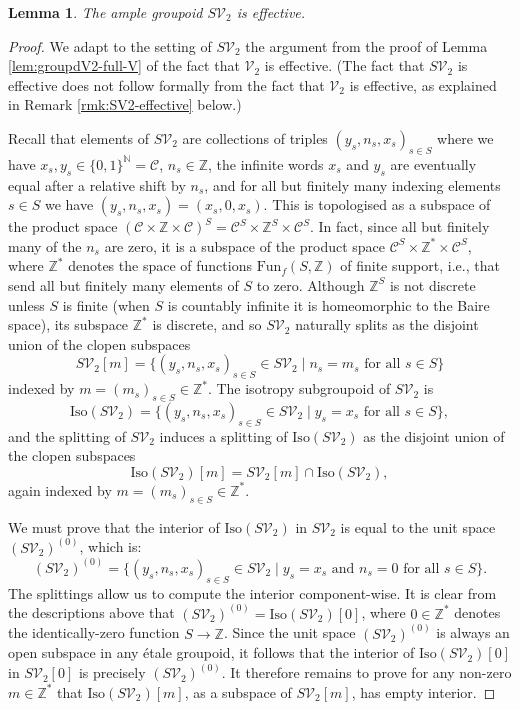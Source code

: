 \documentclass[10pt,a4paper]{amsart}
\numberwithin{equation}{section}
\numberwithin{figure}{section}
\newtheorem{lem}[thm]{Lemma}
\theoremstyle{definition}
\newcommand{\cC}{\mathcal{C}}
\newcommand{\cV}{\mathcal{V}}
\newcommand{\bN}{\mathbb{N}}
\newcommand{\bZ}{\mathbb{Z}}
\begin{document}
\begin{lem}
\label{lem:SV2-is-effective}
The ample groupoid $S\cV_2$ is effective.
\end{lem}
\begin{proof}
We adapt to the setting of $S\cV_2$ the argument from the proof of Lemma \ref{lem:groupdV2-full-V} of the fact that $\cV_2$ is effective. (The fact that $S\cV_2$ is effective does not follow formally from the fact that $\cV_2$ is effective, as explained in Remark \ref{rmk:SV2-effective} below.)

Recall that elements of $S\cV_2$ are collections of triples $(y_s,n_s,x_s)_{s \in S}$ where we have $x_s,y_s \in \{0,1\}^\bN = \cC$, $n_s \in \bZ$, the infinite words $x_s$ and $y_s$ are eventually equal after a relative shift by $n_s$, and for all but finitely many indexing elements $s \in S$ we have $(y_s,n_s,x_s) = (x_s,0,x_s)$. This is topologised as a subspace of the product space $(\cC \times \bZ \times \cC)^S = \cC^S \times \bZ^S \times \cC^S$. In fact, since all but finitely many of the $n_s$ are zero, it is a subspace of the product space $\cC^S \times \bZ^* \times \cC^S$, where $\bZ^*$ denotes the space of functions $\mathrm{Fun}_f(S,\bZ)$ of finite support, i.e., that send all but finitely many elements of $S$ to zero. Although $\bZ^S$ is not discrete unless $S$ is finite (when $S$ is countably infinite it is homeomorphic to the Baire space), its subspace $\bZ^*$ is discrete, and so $S\cV_2$ naturally splits as the disjoint union of the clopen subspaces
\[
S\cV_2[m] = \{ (y_s,n_s,x_s)_{s \in S} \in S\cV_2 \mid n_s = m_s \text{ for all } s \in S \}
\]
indexed by $m = (m_s)_{s \in S} \in \bZ^*$. The isotropy subgroupoid of $S\cV_2$ is
\[
\mathrm{Iso}(S\cV_2) = \{ (y_s,n_s,x_s)_{s \in S} \in S\cV_2 \mid y_s = x_s \text{ for all } s \in S \} ,
\]
and the splitting of $S\cV_2$ induces a splitting of $\mathrm{Iso}(S\cV_2)$ as the disjoint union of the clopen subspaces
\[
\mathrm{Iso}(S\cV_2)[m] = S\cV_2[m] \cap \mathrm{Iso}(S\cV_2),
\]
again indexed by $m = (m_s)_{s \in S} \in \bZ^*$.

We must prove that the interior of $\mathrm{Iso}(S\cV_2)$ in $S\cV_2$ is equal to the unit space $(S\cV_2)^{(0)}$, which is:
\[
(S\cV_2)^{(0)} = \{ (y_s,n_s,x_s)_{s \in S} \in S\cV_2 \mid y_s = x_s \text{ and } n_s = 0 \text{ for all } s \in S \} .
\]
The splittings allow us to compute the interior component-wise. It is clear from the descriptions above that $(S\cV_2)^{(0)} = \mathrm{Iso}(S\cV_2)[0]$, where $0 \in \bZ^*$ denotes the identically-zero function $S \to \bZ$. Since the unit space $(S\cV_2)^{(0)}$ is always an open subspace in any étale groupoid, it follows that the interior of $\mathrm{Iso}(S\cV_2)[0]$ in $S\cV_2[0]$ is precisely $(S\cV_2)^{(0)}$. It therefore remains to prove for any non-zero $m \in \bZ^*$ that $\mathrm{Iso}(S\cV_2)[m]$, as a subspace of $S\cV_2[m]$, has empty interior.


\end{proof}
\end{document}
